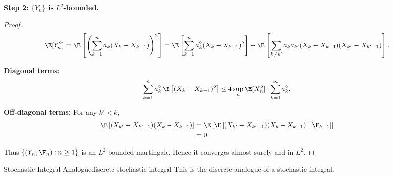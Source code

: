 \textbf{Step 2: $\{Y_n\}$ is $L^2$-bounded.}

\begin{proof}
    \[
        \E[Y_n^2] = \E\left[\left(\sum_{k=1}^{n} a_k (X_k - X_{k-1})\right)^2\right] = \E\left[\sum_{k=1}^{n} a_k^2 (X_k - X_{k-1})^2\right] + \E\left[\sum_{k \neq k'} a_k a_{k'} (X_k - X_{k-1})(X_{k'} - X_{k'-1})\right].
    \]

    \textbf{Diagonal terms:}
    \[
        \sum_{k=1}^{n} a_k^2 \, \E\left[(X_k - X_{k-1})^2\right] \leq 4 \sup_n \E[X_n^2] \cdot \sum_{k=1}^{\infty} a_k^2.
    \]

    \textbf{Off-diagonal terms:} For any $k' < k$,
    \begin{align*}
        \E\left[(X_{k'} - X_{k'-1})(X_k - X_{k-1})\right] &= \E\left[\E\left[(X_{k'} - X_{k'-1})(X_k - X_{k-1}) \mid \F_{k-1}\right]\right] \\
        &= 0.
    \end{align*}

    Thus $\{(Y_n, \F_n) : n \geq 1\}$ is an $L^2$-bounded martingale. Hence it converges almost surely and in $L^2$.
\end{proof}

\begin{remark}{Stochastic Integral Analogue}{discrete-stochastic-integral}
    This is the discrete analogue of a stochastic integral.
\end{remark}
